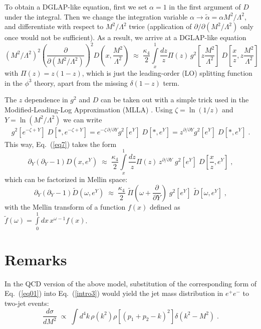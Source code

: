 \documentclass{PoS}
\newcommand{\be}{\begin{equation}}
\newcommand{\ee}[1]{\label{#1} \end{equation}}
\newcommand{\ba}{\begin{eqnarray}}
\newcommand{\ea}[1]{\label{#1} \end{eqnarray}}
\begin{document}
To obtain a DGLAP-like equation, first we set $\alpha=1$ in the first argument of $D$ under the integral. Then we change the integration variable $\alpha\rightarrow \tilde\alpha = \alpha M^2/\Lambda^2$, and differentiate with respect to $M^2/\Lambda^2$ twice (application of $\partial/\partial (M^2/\Lambda^2)$ only once would not be sufficient). As a result, we arrive at a DGLAP-like equation 
\be
\left(M^2/\Lambda^2\right)^2\left(\frac{\partial}{\partial (M^2/\Lambda^2)}\right)^2 D\left(x, \frac{M^2}{\Lambda^2}\right) \;\approx\; \frac{\kappa_4}{2} \int\limits_x^1 \frac{dz}{z} \Pi(z) \, g^2\left[z\frac{M^2}{\Lambda^2} \right] \; D\left[\frac{x}{z} , z \frac{M^2}{\Lambda^2} \right] \;
\ee{eq7}
with $\Pi(z) = z(1-z)$, which is just the leading-order (LO) splitting function in the $\phi^3$ theory, apart from the missing $\delta(1-z)$ term.

The $z$ dependence in $g^2$ and $D$ can be taken out with a simple trick used in the Modified-Leading-Log Approximation (MLLA) \cite{bib:dEnterria1}. Using $\zeta=\ln(1/z)$ and $Y=\ln (M^2/\Lambda^2)$ we can write
\ba
g^2\left[e^{-\zeta + Y} \right] \; D\left[\ast , e^{-\zeta + Y } \right]
= e^{-\zeta\, \partial/\partial Y} g^2\left[e^Y \right] \; D\left[\ast , e^Y \right] = z^{\partial/\partial Y}  g^2\left[e^Y  \right] \; D\left[\ast , e^Y \right] \;.
\ea{eq8}
This way, Eq.~(\ref{eq7}) takes the form 
\be
\partial_Y (\partial_Y -1) D\left(x, e^Y\right) \;\approx\; \frac{\kappa_4}{2} \int\limits_x^1 \frac{dz}{z} \Pi(z)  \, z^{\partial/\partial Y}  \; g^2\left[e^Y\right] \; D\left[\frac{x}{z} , e^Y\right] \;,
\ee{eq9}
which can be factorized in Mellin space:
\be
\partial_Y (\partial_Y -1) \tilde{D}\left(\omega, e^Y\right) \;\approx\; 
 \frac{\kappa_4}{2}  \; \tilde{\Pi}\left(\omega + \frac{\partial}{\partial Y} \right)  \; g^2\left[e^Y\right] \; \tilde{D}\left[\omega , e^Y \right] \;,
\ee{eq10}
with the Mellin transform of a function $f(x)$ defined as $\tilde f (\omega) = \int\limits_0^1 dx\, x^{\omega-1}f(x)$. 

\section{Remarks}
In the QCD version of the above model, substitution of the corresponding form of Eq.~(\ref{eq01}) into Eq.~(\ref{intro3}) would yield the jet mass distribution in $e^+e^-$ to two-jet events:
\be
\frac{d\sigma}{dM^2} \;\propto\; \int d^4k \, \rho\left(k^2\right)  \rho\left[(p_1+p_2-k)^2\right] \delta\left(k^2-M^2\right)\;. 
\ee{r1}
\end{document}
